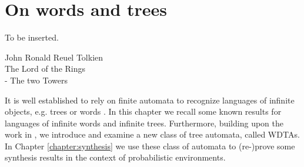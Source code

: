 \chapter{On words and trees}
\epigraph{To be inserted.}{
  John Ronald Reuel Tolkien\\The Lord of the Rings\\ - The two Towers}
It is well established to rely on finite automata to recognize languages of
infinite objects, e.g. trees or words \cite{LangAutoLog}. In this chapter we
recall some known results for languages of infinite words and infinite trees.
Furthermore, building upon the work in \cite{RandAutoInfTrees}, we introduce
and examine a new class of tree automata, called \aclp{WDTA}. In Chapter
\ref{chapter:synthesis} we use these class of automata to (re-)prove some
synthesis results in the context of probabilistic environments.


